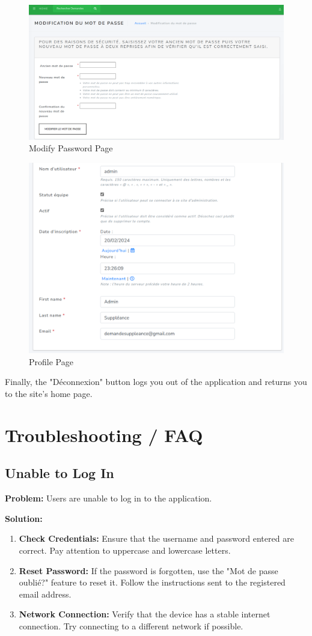 \documentclass[12pt]{article}
\begin{document}
\begin{figure}[H]
    \centering
    \includegraphics[width=0.75\linewidth]{image56.png}
    \caption{Modify Password Page}
\end{figure}

\begin{figure}[H]
    \centering
    \includegraphics[width=0.75\linewidth]{image57.png}
    \caption{Profile Page}
\end{figure}

Finally, the "Déconnexion" button logs you out of the application and returns you to the site's home page.
\section{Troubleshooting / FAQ}\label{trouble}

\subsection{Unable to Log In}

\textbf{Problem:} Users are unable to log in to the application.

\textbf{Solution:}
\begin{enumerate}
    \item \textbf{Check Credentials:} Ensure that the username and password entered are correct. Pay attention to uppercase and lowercase letters.
    \item \textbf{Reset Password:} If the password is forgotten, use the "Mot de passe oublié?" feature to reset it. Follow the instructions sent to the registered email address.
    \item \textbf{Network Connection:} Verify that the device has a stable internet connection. Try connecting to a different network if possible.
\end{enumerate}
\end{document}
